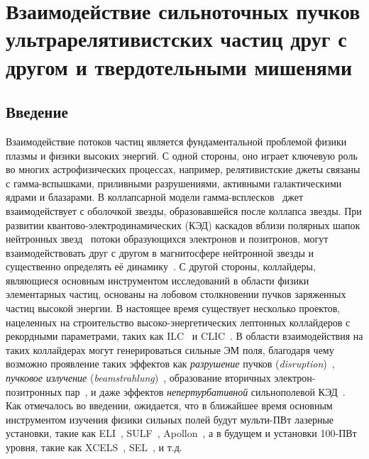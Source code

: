 \chapter{Взаимодействие сильноточных пучков ультрарелятивистских частиц друг с другом и твердотельными мишенями}\label{ch:ch3}

\section{Введение}
\label{sec:ch3/sec1}

Взаимодействие потоков частиц является фундаментальной проблемой физики плазмы и физики высоких энергий.
С одной стороны, оно играет ключевую роль во многих астрофизических процессах, например, релятивистские джеты связаны с гамма-вспышками, приливными разрушениями, активными галактическими ядрами и блазарами.
В коллапсарной модели гамма-всплесков~\cite{macfadyen1999collapsars, woosley1999central} джет взаимодействует с оболочкой звезды, образовавшейся после коллапса звезды.
При развитии квантово-электродинамических (КЭД) каскадов вблизи полярных шапок нейтронных звезд~\cite{sturrock1971model} потоки образующихся электронов и позитронов, могут взаимодействовать друг с другом в магнитосфере нейтронной звезды и существенно определять её динамику~\cite{philippov2015ab}.
С другой стороны, коллайдеры, являющиеся основным инструментом исследований в области физики элементарных частиц, основаны на лобовом столкновении пучков заряженных частиц высокой энергии.
В настоящее время существует несколько проектов, нацеленных на строительство высоко-энергетических лептонных коллайдеров с рекордными параметрами, таких как ILC~\cite{ILC} и CLIC~\cite{CLIC}.
В области взаимодействия на таких коллайдерах могут генерироваться сильные ЭМ поля, благодаря чему возможно проявление таких эффектов как \textit{разрушение} пучков (\textit{disruption})~\cite{hollebeek1981disruption,yokoya1992beam,chen1988disruption}, \textit{пучковое излучение} (\textit{beamstrahlung})~\cite{noble1987beamstrahlung,blankenbecler1987quantum,bell1995quantum}, образование вторичных электрон-позитронных пар~\cite{chen1989coherent,esberg2014strong}, и даже эффектов \textit{непертурбативной} сильнополевой КЭД~\cite{yakimenko2019prospect,tamburini2020efficient}.
Как отмечалось во введении, ожидается, что в ближайшее время основным инструментом изучения физики сильных полей будут мульти-ПВт лазерные установки, такие как ELI~\cite{ELI}, SULF~\cite{SULF}, Apollon~\cite{zou2015design}, а в будущем и установки 100-ПВт уровня, такие как XCELS~\cite{XCELS}, SEL~\cite{SEL}, и т.д.
